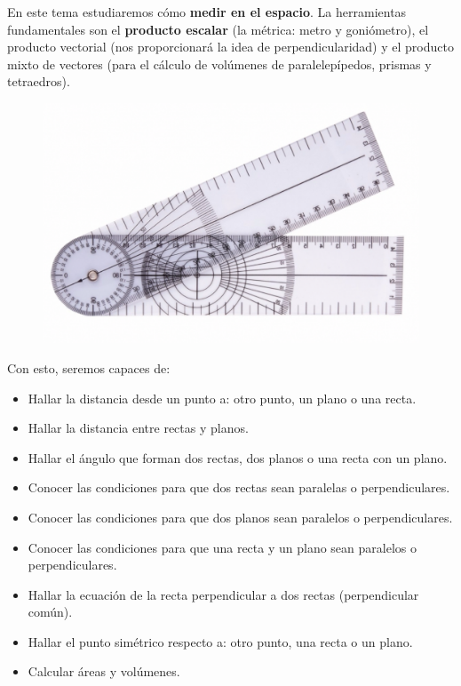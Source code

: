 En este tema estudiaremos cómo \textbf{medir en el espacio}. La herramientas fundamentales son el \textbf{producto escalar} (la métrica: metro y goniómetro), el producto vectorial (nos proporcionará la idea de perpendicularidad) y el producto mixto de vectores (para el cálculo de volúmenes de paralelepípedos, prismas y tetraedros).

\begin{figure}[H]
		\centering
		\includegraphics[width=1\textwidth]{imagenes/imagenes11/T11IM02.png}
\end{figure}

Con esto, seremos capaces de:

\begin{itemize}
\item Hallar la distancia desde un punto a: otro punto, un plano o una recta.
\item Hallar la distancia entre rectas y planos.
\item Hallar el ángulo que forman dos rectas, dos planos o una recta con un plano.
\item Conocer las condiciones para que dos rectas sean paralelas o perpendiculares.
\item Conocer las condiciones para que dos planos sean paralelos o perpendiculares.
\item Conocer las condiciones para que una recta y un plano sean paralelos o perpendiculares.
\item Hallar la ecuación de la recta perpendicular a dos rectas (perpendicular común).
\item Hallar el punto simétrico respecto a: otro punto, una recta o un plano.
\item Calcular áreas y volúmenes.
\end{itemize}

